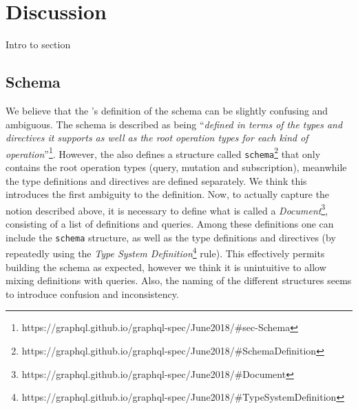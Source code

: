 \section{Discussion}\label{sec:discussion}
Intro to section


\subsection{\gql Schema}

We believe that the \spec's definition of the schema can be slightly confusing and ambiguous. The schema is described as being ``\textit{defined in terms of the types and directives it supports as well as the root operation types for each kind of operation}''\footnote{https://graphql.github.io/graphql-spec/June2018/\#sec-Schema}. However, the \spec also defines a structure called \texttt{schema}\footnote{https://graphql.github.io/graphql-spec/June2018/\#SchemaDefinition} that only contains the root operation types (query, mutation and subscription), meanwhile the type definitions and directives are defined separately. We think this introduces the first ambiguity to the definition. Now, to actually capture the notion described above, it is necessary to define what is called a \textit{Document}\footnote{https://graphql.github.io/graphql-spec/June2018/\#Document}, consisting of a list of definitions and queries. Among these definitions one can include the \texttt{schema} structure, as well as the type definitions and directives (by repeatedly using the \textit{Type System Definition}\footnote{https://graphql.github.io/graphql-spec/June2018/\#TypeSystemDefinition} rule). This effectively permits building the schema as expected, however we think it is unintuitive to allow mixing definitions with queries. Also, the naming of the different structures seems to introduce confusion and inconsistency.

 


